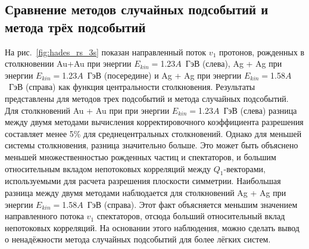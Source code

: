 \subsection{Сравнение методов случайных подсобытий и метода трёх подсобытий}

На рис.~\ref{fig:hades_rs_3s} показан направленный поток $v_1$ протонов, рожденных в столкновении Au+Au при энергии $E_{kin}=$1.23$A$~ГэВ (слева), Ag + Ag при энергии $E_{kin}=$1.23$A$~ГэВ (посередине) и Ag + Ag при энергии $E_{kin}=$1.58$A$~ГэВ (справа) как функция центральности столкновения. Результаты представлены для методов трех подсобытий и метода случайных подсобытий.
Для столкновений Au + Au при при энергии $E_{kin}=$1.23$A$~ГэВ (слева) разница между двумя методами вычисления корректировочного коэффициента разрешения составляет менее 5\% для среднецентральных столкновений.
Однако для меньшей системы столкновения, разница значительно больше. 
Это может быть объяснено меньшей множественностью рожденных частиц и спектаторов, и большим относительным вкладом непотоковых корреляций между $Q_1$-векторами, используемыми для расчета разрешения плоскости симметрии.
Наибольшая разница между двумя методами наблюдается для столкновений Ag + Ag при энергии $E_{kin}=$1.58$A$~ГэВ (справа).
Этот факт объясняется меньшим значением направленного потока $v_1$ спектаторов, отсюда больший относительный вклад непотоковых корреляций.
На основании этого наблюдения, можно сделать вывод о ненадёжности метода случайных подсобытий для более лёгких систем.
%
